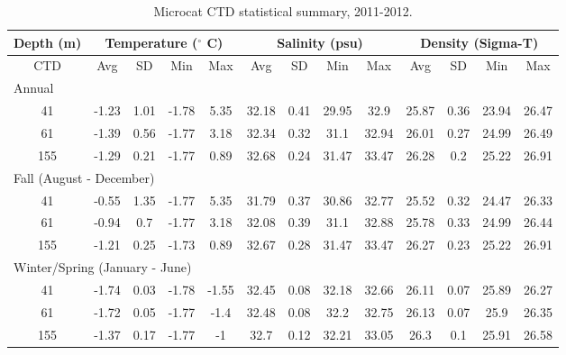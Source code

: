 \documentclass[12pt]{dforeport}
\begin{document}
\begin{landscape}
\begin{table}[ht] 
\centering
\caption[Microcat CTD statistical summary, 2011-2012]{Microcat CTD statistical summary, 2011-2012.} 
\label{t:ss_2011_2012}
\begin{tabular}{c | c c c c | c c c c | c c c c}
\toprule 
\multicolumn{1}{c}{\textbf{Depth (m)}} & \multicolumn{4}{c}{\textbf{Temperature ($^\circ$ C)}} & \multicolumn{4}{c}{\textbf{Salinity (psu)}} & \multicolumn{4}{c}{\textbf{Density (Sigma-T)}} \\\hline
\midrule
CTD & Avg & SD & Min & Max & Avg & SD & Min & Max & Avg & SD & Min & Max \\  
\midrule 
\multicolumn{13}{l}{Annual} \\
\midrule
41 & -1.23 & 1.01 & -1.78 & 5.35 & 32.18 & 0.41 & 29.95 & 32.9 & 25.87 & 0.36 & 23.94 & 26.47 \\
61 & -1.39 & 0.56 & -1.77 & 3.18 & 32.34 & 0.32 & 31.1 & 32.94 & 26.01 & 0.27 & 24.99 & 26.49 \\
155 & -1.29 & 0.21 & -1.77 & 0.89 & 32.68 & 0.24 & 31.47 & 33.47 & 26.28 & 0.2 & 25.22 & 26.91 \\
\midrule 
\multicolumn{13}{l}{Fall (August - December)} \\
\midrule
41 & -0.55 & 1.35 & -1.77 & 5.35 & 31.79 & 0.37 & 30.86 & 32.77 & 25.52 & 0.32 & 24.47 & 26.33 \\
61 & -0.94 & 0.7 & -1.77 & 3.18 & 32.08 & 0.39 & 31.1 & 32.88 & 25.78 & 0.33 & 24.99 & 26.44 \\
155 & -1.21 & 0.25 & -1.73 & 0.89 & 32.67 & 0.28 & 31.47 & 33.47 & 26.27 & 0.23 & 25.22 & 26.91 \\
\midrule  
\multicolumn{13}{l}{Winter/Spring (January - June)} \\
\midrule
41 & -1.74 & 0.03 & -1.78 & -1.55 & 32.45 & 0.08 & 32.18 & 32.66 & 26.11 & 0.07 & 25.89 & 26.27 \\
61 & -1.72 & 0.05 & -1.77 & -1.4 & 32.48 & 0.08 & 32.2 & 32.75 & 26.13 & 0.07 & 25.9 & 26.35 \\
155 & -1.37 & 0.17 & -1.77 & -1 & 32.7 & 0.12 & 32.21 & 33.05 & 26.3 & 0.1 & 25.91 & 26.58 \\
\bottomrule
\end{tabular}
\end{table}



\end{landscape}
\end{document}
